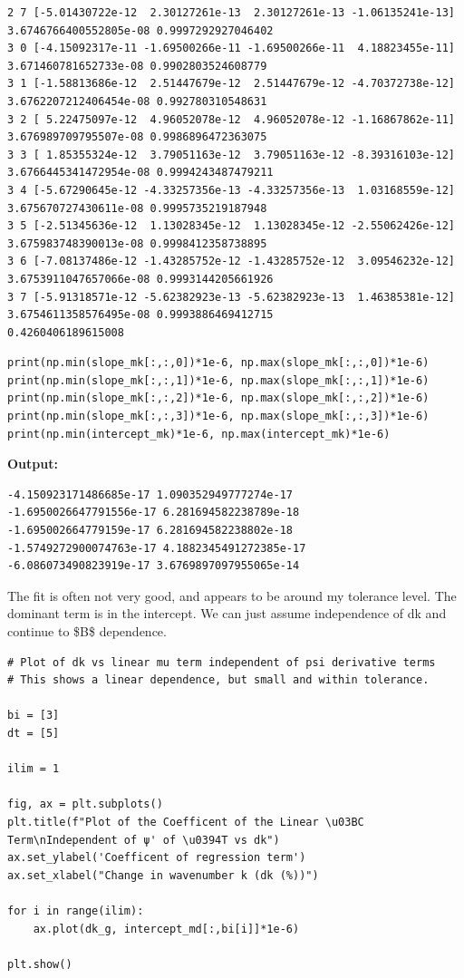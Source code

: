 \documentclass{article}
\begin{document}
\begin{verbatim}
2 7 [-5.01430722e-12  2.30127261e-13  2.30127261e-13 -1.06135241e-13] 3.6746766400552805e-08 0.9997292927046402
3 0 [-4.15092317e-11 -1.69500266e-11 -1.69500266e-11  4.18823455e-11] 3.671460781652733e-08 0.9902803524608779
3 1 [-1.58813686e-12  2.51447679e-12  2.51447679e-12 -4.70372738e-12] 3.6762207212406454e-08 0.992780310548631
3 2 [ 5.22475097e-12  4.96052078e-12  4.96052078e-12 -1.16867862e-11] 3.676989709795507e-08 0.9986896472363075
3 3 [ 1.85355324e-12  3.79051163e-12  3.79051163e-12 -8.39316103e-12] 3.6766445341472954e-08 0.9994243487479211
3 4 [-5.67290645e-12 -4.33257356e-13 -4.33257356e-13  1.03168559e-12] 3.675670727430611e-08 0.9995735219187948
3 5 [-2.51345636e-12  1.13028345e-12  1.13028345e-12 -2.55062426e-12] 3.675983748390013e-08 0.9998412358738895
3 6 [-7.08137486e-12 -1.43285752e-12 -1.43285752e-12  3.09546232e-12] 3.6753911047657066e-08 0.9993144205661926
3 7 [-5.91318571e-12 -5.62382923e-13 -5.62382923e-13  1.46385381e-12] 3.6754611358576495e-08 0.9993886469412715
0.4260406189615008

\end{verbatim}

\begin{lstlisting}
print(np.min(slope_mk[:,:,0])*1e-6, np.max(slope_mk[:,:,0])*1e-6)
print(np.min(slope_mk[:,:,1])*1e-6, np.max(slope_mk[:,:,1])*1e-6)
print(np.min(slope_mk[:,:,2])*1e-6, np.max(slope_mk[:,:,2])*1e-6)
print(np.min(slope_mk[:,:,3])*1e-6, np.max(slope_mk[:,:,3])*1e-6)
print(np.min(intercept_mk)*1e-6, np.max(intercept_mk)*1e-6)\end{lstlisting}

\textbf{Output:}\begin{verbatim}
-4.150923171486685e-17 1.090352949777274e-17
-1.6950026647791556e-17 6.281694582238789e-18
-1.695002664779159e-17 6.281694582238802e-18
-1.5749272900074763e-17 4.1882345491272385e-17
-6.086073490823919e-17 3.6769897097955065e-14

\end{verbatim}

The fit is often not very good, and appears to be around my tolerance level. The dominant term is in the intercept. We can just assume independence of dk and continue to \$B\$ dependence.

\begin{lstlisting}
# Plot of dk vs linear mu term independent of psi derivative terms
# This shows a linear dependence, but small and within tolerance.

bi = [3]
dt = [5]

ilim = 1

fig, ax = plt.subplots()
plt.title(f"Plot of the Coefficent of the Linear \u03BC Term\nIndependent of ψ' of \u0394T vs dk")
ax.set_ylabel('Coefficent of regression term')
ax.set_xlabel("Change in wavenumber k (dk (%))")

for i in range(ilim):
    ax.plot(dk_g, intercept_md[:,bi[i]]*1e-6)

plt.show()\end{lstlisting}
\end{document}
